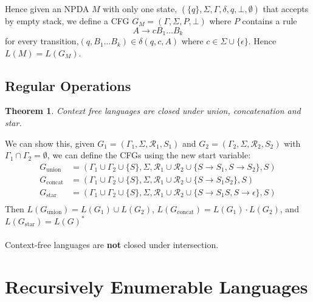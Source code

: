 \documentclass{article}
\newtheorem{thm}{Theorem}
\begin{document}
        Hence given an NPDA $M$ with only one state, $( \{ q \}, \Sigma, \Gamma, \delta, q, \bot, \emptyset )$ that accepts by empty stack, we define a CFG $G_M = (\Gamma, \Sigma, P, \bot)$ where $P$ contains a rule 
        \[ A \to cB_1 \ldots B_k \]
        for every transition,$(q, B_1 \ldots B_k) \in \delta(q, c, A)$ where $c \in \Sigma \cup \{  \epsilon \}$. Hence $L(M) = L(G_M)$. 
    \subsection{Regular Operations}
        \begin{thm}
            Context free languages are closed under union, concatenation and star. 
        \end{thm}
        We can show this, given $G_1 = (\Gamma_1, \Sigma, \mathcal{R}_1, S_1)$ and $G_2 = (\Gamma_2, \Sigma, \mathcal{R}_2, S_2)$ with $\Gamma_1 \cap \Gamma_2 = \emptyset$, we can define the CFGs using the new start variable:
        \begin{align*}
            G_{\text{union}} &= (\Gamma_1 \cup \Gamma_2 \cup \{ S \}, \Sigma, \mathcal{R}_1 \cup \mathcal{R}_2 \cup \{ S \to S_1, S \to S_2 \}, S) \\ 
            G_{\text{concat}} &= (\Gamma_1 \cup \Gamma_2 \cup \{ S \}, \Sigma, \mathcal{R}_1 \cup \mathcal{R}_2 \cup \{ S \to S_1 S_2 \}, S) \\
            G_{\text{star}} &= (\Gamma_1 \cup \Gamma_2 \cup \{ S \}, \Sigma, \mathcal{R}_1 \cup \mathcal{R}_2 \cup \{ S \to S_1 S, S \to \epsilon \}, S) \\
        \end{align*}
        Then $L(G_{\text{union}}) = L(G_1) \cup  L(G_2)$, $L(G_{\text{concat}}) = L(G_1) \cdot L(G_2)$, and $L(G_{\text{star}}) = L(G)^*$ \\ \\
        Context-free languages are \textbf{not} closed under intersection. 
\section{Recursively Enumerable Languages}
\end{document}
